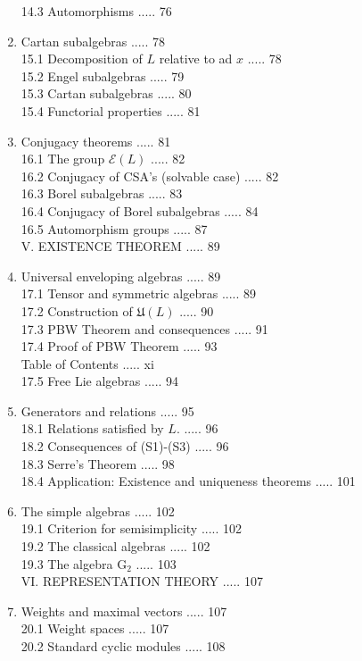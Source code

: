 \documentclass[10pt]{article}
\begin{document}
\begin{enumerate}
14.3 Automorphisms ..... 76
  \item Cartan subalgebras ..... 78\\
15.1 Decomposition of $L$ relative to ad $x$ ..... 78\\
15.2 Engel subalgebras ..... 79\\
15.3 Cartan subalgebras ..... 80\\
15.4 Functorial properties ..... 81
  \item Conjugacy theorems ..... 81\\
16.1 The group $\mathscr{E}(L)$ ..... 82\\
16.2 Conjugacy of CSA's (solvable case) ..... 82\\
16.3 Borel subalgebras ..... 83\\
16.4 Conjugacy of Borel subalgebras ..... 84\\
16.5 Automorphism groups ..... 87\\
V. EXISTENCE THEOREM ..... 89
  \item Universal enveloping algebras ..... 89\\
17.1 Tensor and symmetric algebras ..... 89\\
17.2 Construction of $\mathfrak{U}(L)$ ..... 90\\
17.3 PBW Theorem and consequences ..... 91\\
17.4 Proof of PBW Theorem ..... 93\\
Table of Contents ..... xi\\
17.5 Free Lie algebras ..... 94
  \item Generators and relations ..... 95\\
18.1 Relations satisfied by $L$. ..... 96\\
18.2 Consequences of (S1)-(S3) ..... 96\\
18.3 Serre's Theorem ..... 98\\
18.4 Application: Existence and uniqueness theorems ..... 101
  \item The simple algebras ..... 102\\
19.1 Criterion for semisimplicity ..... 102\\
19.2 The classical algebras ..... 102\\
19.3 The algebra $\mathrm{G}_{2}$ ..... 103\\
VI. REPRESENTATION THEORY ..... 107
  \item Weights and maximal vectors ..... 107\\
20.1 Weight spaces ..... 107\\
20.2 Standard cyclic modules ..... 108\\

\end{enumerate}
\end{document}
